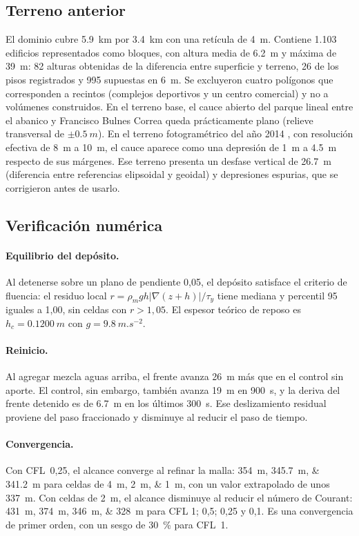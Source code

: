 \subsection{Terreno anterior}\label{sec:res-terreno}
El dominio cubre \SI{5,9}{km} por \SI{3,4}{km} con una retícula de \SI{4}{m}. Contiene 1.103 edificios representados como bloques, con altura media de \SI{6,2}{m} y máxima de \SI{39}{m}: 82 alturas obtenidas de la diferencia entre superficie y terreno, 26 de los pisos registrados y 995 supuestas en \SI{6}{m}. Se excluyeron cuatro polígonos que corresponden a recintos (complejos deportivos y un centro comercial) y no a volúmenes construidos. En el terreno base, el cauce abierto del parque lineal entre el abanico y Francisco Bulnes Correa queda prácticamente plano (relieve transversal de $\pm\SI{0,5}{m}$). En el terreno fotogramétrico del año 2014 \citep{hussain2021}, con resolución efectiva de \SI{8}{m} a \SI{10}{m}, el cauce aparece como una depresión de \SI{1}{m} a \SI{4,5}{m} respecto de sus márgenes. Ese terreno presenta un desfase vertical de \SI{26,7}{m} (diferencia entre referencias elipsoidal y geoidal) y depresiones espurias, que se corrigieron antes de usarlo.

\subsection{Verificación numérica}\label{sec:res-verif}
\paragraph{Equilibrio del depósito.} Al detenerse sobre un plano de pendiente 0,05, el depósito satisface el criterio de fluencia: el residuo local $r=\rho_m g h|\nabla(z+h)|/\tau_y$ tiene mediana y percentil 95 iguales a 1,00, sin celdas con $r>1{,}05$. El espesor teórico de reposo es $h_c=\SI{0,1200}{m}$ con $g=\SI{9,8}{m.s^{-2}}$.
\paragraph{Reinicio.} Al agregar mezcla aguas arriba, el frente avanza \SI{26}{m} más que en el control sin aporte. El control, sin embargo, también avanza \SI{19}{m} en \SI{900}{s}, y la deriva del frente detenido es de \SI{6,7}{m} en los últimos \SI{300}{s}. Ese deslizamiento residual proviene del paso fraccionado y disminuye al reducir el paso de tiempo.
\paragraph{Convergencia.} Con CFL~0,25, el alcance converge al refinar la malla: \SIlist{354;345,7;341,2}{m} para celdas de \SIlist{4;2;1}{m}, con un valor extrapolado de unos \SI{337}{m}. Con celdas de \SI{2}{m}, el alcance disminuye al reducir el número de Courant: \SIlist{431;374;346;328}{m} para CFL 1; 0,5; 0,25 y 0,1. Es una convergencia de primer orden, con un sesgo de \SI[retain-explicit-plus=true]{+30}{\percent} para CFL~1.
